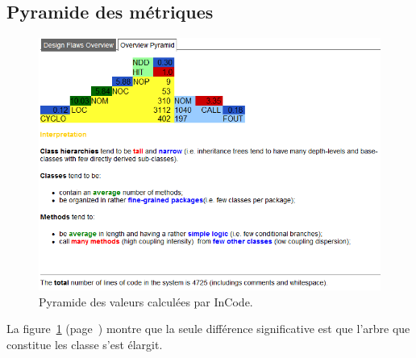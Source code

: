 \documentclass[12pt,a4paper,final]{article}
\newcommand{\labelfigure}[1]{figure~\ref{#1} (page~\pageref{#1})}
\begin{document}
\subsection{Pyramide des métriques}
\begin{figure}[!h]
	\centering
	\includegraphics[width=\textwidth]{InCodePyramid_refactor.png}
	\caption{\label{pyramid_refact}Pyramide des valeurs calculées par InCode.}
\end{figure}
La \labelfigure{pyramid_refact} montre que la seule différence significative est que l'arbre que constitue les classe s'est élargit.\\

\clearpage
\end{document}
